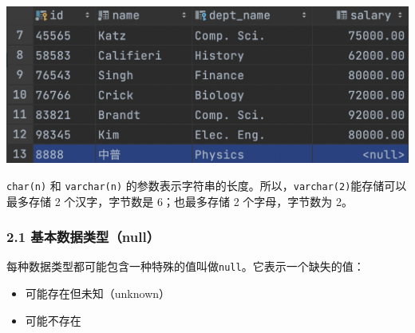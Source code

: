 \documentclass[aspectratio=169, 14pt]{beamer}
\begin{document}
\begin{frame}
\begin{center}
    \includegraphics[width=.9\textwidth]{week3/dg-instructor}
\end{center}
\texttt{char(n)} 和 \texttt{varchar(n)} 的参数表示\alert{字符串}的长度。所以，\texttt{varchar(2)}能存储可以最多存储 2 个汉字，字节数是 6；也最多存储 2 个字母，字节数为 2。

\end{frame}

\begin{frame}
    \frametitle{2.1 基本数据类型（null）}
    每种数据类型都可能包含一种特殊的值叫做\texttt{null}。它表示一个缺失的值：
    \begin{itemize}
        \item 可能存在但未知（unknown）
        \item 可能不存在        
    \end{itemize}
\end{frame}
\end{document}
